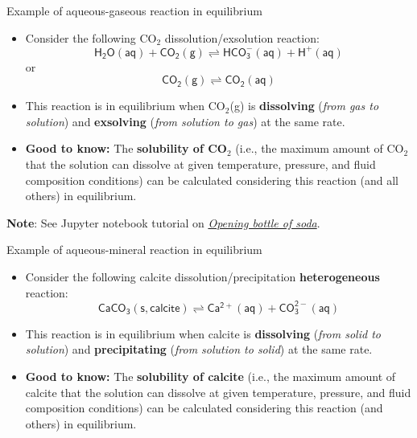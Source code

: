 %
%
\begin{frame}[<+->]{Example of aqueous-gaseous reaction in equilibrium}
\begin{itemize}
\item Consider the following CO$_{2}$ dissolution/exsolution reaction:
\[
\mathsf{H_2O(aq) + CO_{2}(g) \rightleftharpoons HCO^-_3(aq) + H^+(aq)}
\]
%
or
%
\[
\mathsf{CO_{2}(g) \rightleftharpoons CO_2(aq)}
\]
\item This reaction is in equilibrium when CO$_{2}$(g) is \textbf{dissolving
}(\emph{from gas to solution}) and \textbf{exsolving} (\emph{from
solution to gas}) at the same rate. 
\item \alert{\textbf{Good to know:}} The \textbf{solubility of
CO$_{2}$} (i.e., the maximum amount of CO$_{2}$ that the solution
can dissolve at given temperature, pressure, and fluid composition
conditions) can be calculated considering this reaction (and all others)
in equilibrium.
\end{itemize}
%
\alert{\textbf{Note}}: See Jupyter notebook tutorial on  \href{https://github.com/mtsveta/reaktoro-jupyter/blob/geofluids-examples/tutorial/eq.co2-solubility-in-water.ipynb}{\emph{Opening bottle of soda}}.
%
\end{frame}
%
%
\begin{frame}[<+->]{Example of aqueous-mineral reaction in equilibrium}
\begin{itemize}
\item Consider the following calcite dissolution/precipitation \textbf{heterogeneous} reaction:
\[
\mathrm{\mathsf{CaCO_{3}(s,calcite) \rightleftharpoons Ca^{2+}(aq)+CO_{3}^{2-}(aq)}}
\]
\item This reaction is in equilibrium when calcite is \textbf{dissolving
}(\emph{from solid to solution}) and \textbf{precipitating} (\emph{from
solution to solid}) at the same rate. 
\item \textbf{\alert{\textbf{Good to know:}}} The \textbf{solubility of
calcite} (i.e., the maximum amount of calcite that the solution can
dissolve at given temperature, pressure, and fluid composition conditions)
can be calculated considering this reaction (and others) in equilibrium.
\end{itemize}
\end{frame}